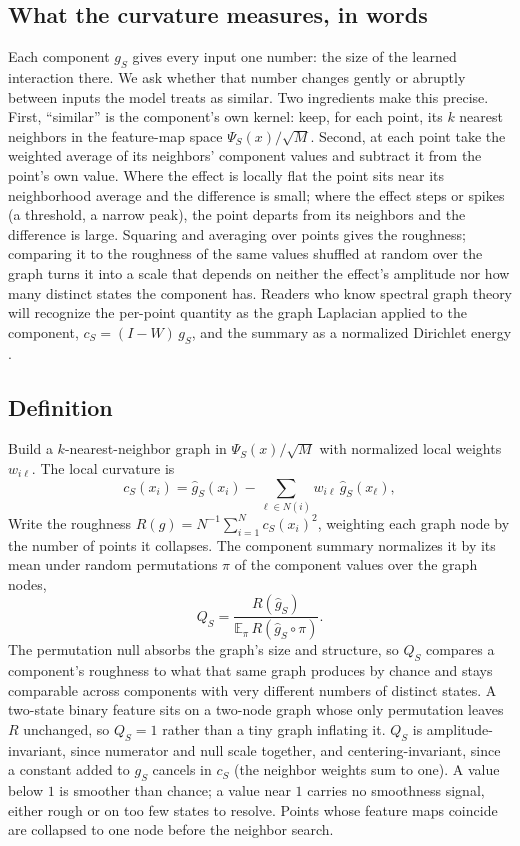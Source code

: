 \documentclass[11pt]{article}
\begin{document}
\subsection{What the curvature measures, in words}

Each component $g_S$ gives every input one number: the size of the learned
interaction there. We ask whether that number changes gently or abruptly between
inputs the model treats as similar. Two ingredients make this precise. First,
``similar'' is the component's own kernel: keep, for each point, its $k$ nearest
neighbors in the feature-map space $\Psi_S(x)/\sqrt{M}$. Second, at each point
take the weighted average of its neighbors' component values and subtract it from
the point's own value. Where the effect is locally flat the point sits near its
neighborhood average and the difference is small; where the effect steps or
spikes (a threshold, a narrow peak), the point departs from its neighbors and
the difference is large. Squaring and averaging over points gives the roughness;
comparing it to the roughness of the same values shuffled at random over the
graph turns it into a scale that depends on neither the effect's amplitude nor
how many distinct states the component has. Readers who
know spectral graph theory will recognize the per-point quantity as the graph
Laplacian applied to the component, $c_S=(I-W)\,g_S$, and the summary as a
normalized Dirichlet energy \cite{Chung1997,BelkinNiyogi2003}.

\subsection{Definition}

Build a $k$-nearest-neighbor graph in $\Psi_S(x)/\sqrt{M}$ with normalized local
weights $w_{i\ell}$. The local curvature is
\begin{equation}
 c_S(x_i)=\hat g_S(x_i)-\sum_{\ell\in N(i)}w_{i\ell}\,\hat g_S(x_\ell),
\end{equation}
Write the roughness $R(g)=N^{-1}\sum_{i=1}^N c_S(x_i)^2$, weighting each graph
node by the number of points it collapses. The component summary normalizes it by
its mean under random permutations $\pi$ of the component values over the graph
nodes,
\begin{equation}
 Q_S=\frac{R(\hat g_S)}{\mathbb{E}_\pi\,R(\hat g_S\circ\pi)}.
\label{eq:curvature}
\end{equation}
The permutation null absorbs the graph's size and structure, so $Q_S$ compares a
component's roughness to what that same graph produces by chance and stays
comparable across components with very different numbers of distinct states. A
two-state binary feature sits on a two-node graph whose only permutation leaves
$R$ unchanged, so $Q_S=1$ rather than a tiny graph inflating it. $Q_S$ is
amplitude-invariant, since numerator and null scale together, and
centering-invariant, since a constant added to $g_S$ cancels in $c_S$ (the
neighbor weights sum to one). A value below $1$ is smoother than chance; a value
near $1$ carries no smoothness signal, either rough or on too few states to
resolve. Points whose feature maps coincide are collapsed to one node
before the neighbor search.
\end{document}
